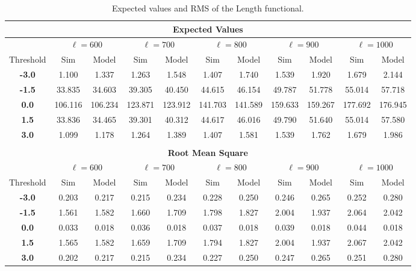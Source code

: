 \documentclass[aps,prd,showpacs,superscriptaddress,groupedaddress]{revtex4-1}  %
\begin{document}
\begin{table}
\centering
\begin{tabular}{|c||c|c|c|c|c|c|c|c|c|c|}
\multicolumn{11}{c}{\textbf{Expected Values}}   \\
\hline 
& \multicolumn{2}{c|}{$\ell=600$} & \multicolumn{2}{c|}{$\ell=700$} & \multicolumn{2}{c|}{$\ell=800$} & \multicolumn{2}{c|}{$\ell=900$} & \multicolumn{2}{c|}{$\ell=1000$}\\ 
 \hline
Threshold & Sim & Model & Sim & Model & Sim & Model & Sim & Model & Sim & Model\\ 
 \hline
\textbf{-3.0} & 1.100 & 1.337 & 1.263 & 1.548 & 1.407 & 1.740 & 1.539 & 1.920 & 1.679 & 2.144\\
\textbf{-1.5} & 33.835 & 34.603 & 39.305 & 40.450 & 44.615 & 46.154 & 49.787 & 51.778 & 55.014 & 57.718\\
\textbf{0.0} & 106.116 & 106.234 & 123.871 & 123.912 & 141.703 & 141.589 & 159.633 & 159.267 & 177.692 & 176.945\\
\textbf{1.5} & 33.836 & 34.465 & 39.301 & 40.312 & 44.617 & 46.016 & 49.790 & 51.640 & 55.014 & 57.580\\
\textbf{3.0} & 1.099 & 1.178 & 1.264 & 1.389 & 1.407 & 1.581 & 1.539 & 1.762 & 1.679 & 1.986\\

\hline 
\multicolumn{11}{c}{}   \\
\multicolumn{11}{c}{\textbf{Root Mean Square}}   \\
\hline 

& \multicolumn{2}{c|}{$\ell=600$} & \multicolumn{2}{c|}{$\ell=700$} & \multicolumn{2}{c|}{$\ell=800$} & \multicolumn{2}{c|}{$\ell=900$} & \multicolumn{2}{c|}{$\ell=1000$}\\ 
 \hline
Threshold & Sim & Model & Sim & Model & Sim & Model & Sim & Model & Sim & Model\\ 
 \hline
\textbf{-3.0} & 0.203 & 0.217 & 0.215 & 0.234 & 0.228 & 0.250 & 0.246 & 0.265 & 0.252 & 0.280\\
\textbf{-1.5} & 1.561 & 1.582 & 1.660 & 1.709 & 1.798 & 1.827 & 2.004 & 1.937 & 2.064 & 2.042\\
\textbf{0.0} & 0.033 & 0.018 & 0.036 & 0.018 & 0.037 & 0.018 & 0.039 & 0.018 & 0.044 & 0.018\\
\textbf{1.5} & 1.565 & 1.582 & 1.659 & 1.709 & 1.794 & 1.827 & 2.004 & 1.937 & 2.067 & 2.042\\
\textbf{3.0} & 0.202 & 0.217 & 0.215 & 0.234 & 0.227 & 0.250 & 0.247 & 0.265 & 0.251 & 0.280\\
\hline 
\end{tabular} \\
\caption{Expected values and RMS of the Length functional.}  \\
\label{tab:length_mean_rms} \\
\end{table}
\end{document}
